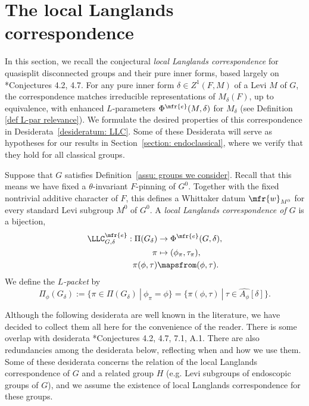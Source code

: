 \documentclass[11pt,letterpaper]{amsart}
\numberwithin{equation}{section}
\begin{document}
\section{The local Langlands correspondence}\label{section: LLC}

In this section, we recall the conjectural {\it local Langlands correspondence} for {quasisplit} disconnected groups and their pure inner forms, based largely on \cite{Kal26}*{Conjectures 4.2, 4.7}. 
For any pure inner form $\delta \in Z^1(F,M)$ of a Levi $M$ of $G$, the correspondence matches irreducible representations of $M_\delta(F)$, up to equivalence, with enhanced $L$-parameters $\Phi^{\mfr{e}}(M,\delta)$ for $M_{\delta}$ (see Definition \ref{def L-par relevance}).
We formulate the desired properties of this correspondence in Desiderata~\ref{desideratum: LLC}.
Some of these Desiderata will serve as hypotheses for our results in Section~\ref{section: endoclassical}, where we verify that they hold for all classical groups.

\begin{definition}\label{definition: LLC}
    Suppose that $G$ satisfies Definition~\ref{assu: groups we consider}. 
Recall that this means we have fixed a $\theta$-invariant $F$-pinning of $G^0$. Together with the fixed nontrivial additive character of $F$, this defines a Whittaker datum $\mfr{w}_{M^0}$ for every standard Levi subgroup $M^0$ of $G^0$. 
 A {\it local Langlands correspondence of $G$}  is a bijection,
\[
    \begin{aligned}
\LLC^{\mfr{e}}_{G,{\delta}}: \Pi(G_{\delta}) &\to \Phi^{\mfr{e}}(G,\delta),\\
    \pi& \mapsto (\phi_{\pi}, \tau_{\pi}),\\
    \pi(\phi,\tau)& \mapsfrom (\phi,\tau).
    \end{aligned}
\]
We define the {\it $L$-packet} by
    \[ 
    \Pi_{\phi}(G_{\delta}):= \{\pi \in \Pi(G_{\delta})\ | \ \phi_{\pi}= \phi \}= \{\pi(\phi,\tau)\ | \ \tau \in \widehat{A_{\phi}}[\delta]\}.
    \] 
\end{definition}

Although the following desiderata are well known in the literature, we have decided to collect them all here for the convenience of the reader.
There is some overlap with desiderata  \cite{Kal26}*{Conjectures 4.2, 4.7, 7.1, A.1}.
There are also redundancies among the desiderata below, reflecting when and how we use them. Some of these desiderata concerns the relation of the local Langlands correspondence of $G$ and a related group $H$ (e.g. Levi subgroups of endoscopic groups of $G$), and we assume the existence of local Langlands correspondence for these groups.
\end{document}
